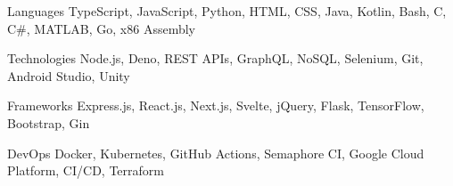 

\begin{cvskills}

  \cvskill
    {Languages} %
    {TypeScript, JavaScript, Python, HTML, CSS, Java, Kotlin, Bash, C, C\#, MATLAB, Go, x86 Assembly } %

  \cvskill
    {Technologies} %
    {Node.js, Deno, REST APIs, GraphQL, NoSQL, Selenium, Git, Android Studio, Unity} %

  \cvskill
    {Frameworks} %
    {Express.js, React.js, Next.js, Svelte, jQuery, Flask, TensorFlow, Bootstrap, Gin} %

  \cvskill
    {DevOps} %
    {Docker, Kubernetes, GitHub Actions, Semaphore CI, Google Cloud Platform, CI/CD, Terraform} %

\end{cvskills}
